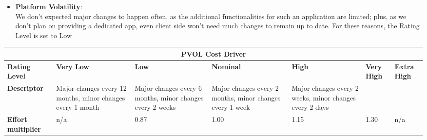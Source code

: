 \begin{itemize}
\item \textbf{Platform Volatility}:\\
We don't expected major changes to happen often, as the additional functionalities for such an application are limited; plus, as we don't plan on providing a dedicated app, even client side won't need much changes to remain up to date. For these reasons, the Rating Level is set to Low
\end{itemize}
\hspace*{-3cm}\begin{tabular}{|p{3cm}|p{2cm}|p{2cm}|p{2cm}|p{2cm}|p{2cm}|p{2cm}|}
\hline
\multicolumn{7}{|c|}{\textbf{PVOL Cost Driver}}\\
\hline
\hline
\textbf{Rating Level} & \textbf{Very Low} & \textbf{Low} & \textbf{Nominal} & \textbf{High} & \textbf{Very High} & \textbf{Extra High}\\
\hline
\textbf{Descriptor} & Major changes every 12 months, minor changes every 1 month & Major changes every 6 months, minor changes every 2 weeks & Major changes every 2 months, minor changes every 1 week & Major changes every 2 weeks, minor changes every 2 days &  & \\
\hline
\textbf{Effort multiplier} & n/a & 0.87 & 1.00 & 1.15 & 1.30 & n/a\\
\hline 
\end{tabular}